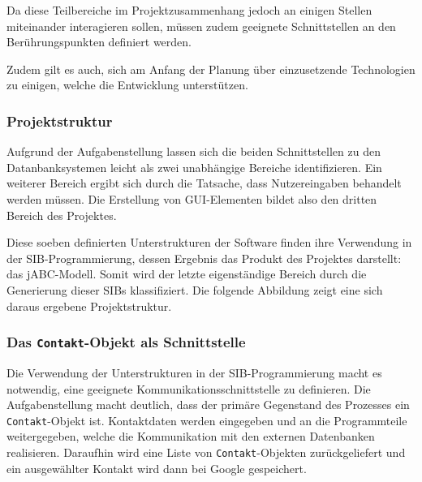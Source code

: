Da diese Teilbereiche im Projektzusammenhang jedoch an einigen Stellen miteinander interagieren sollen, müssen
 zudem geeignete Schnittstellen an den Berührungspunkten definiert werden.
 
Zudem gilt es auch, sich am Anfang der Planung über einzusetzende Technologien zu einigen, welche die Entwicklung unterstützen.

\subsubsection{Projektstruktur}
Aufgrund der Aufgabenstellung lassen sich die beiden Schnittstellen zu den Datanbanksystemen leicht als zwei
 unabhängige Bereiche identifizieren.
Ein weiterer Bereich ergibt sich durch die Tatsache, dass Nutzereingaben behandelt werden müssen.
Die Erstellung von GUI-Elementen bildet also den dritten Bereich des Projektes.

Diese soeben definierten Unterstrukturen der Software finden ihre Verwendung in der SIB-Programmierung, dessen
 Ergebnis das Produkt des Projektes darstellt: das jABC-Modell.
Somit wird der letzte eigenständige Bereich durch die Generierung dieser SIBs klassifiziert.
Die folgende Abbildung zeigt eine sich daraus ergebene Projektstruktur.
	
\subsubsection{Das \lstinline{Contakt}-Objekt als Schnittstelle}
Die Verwendung der Unterstrukturen in der SIB-Programmierung macht es notwendig, eine geeignete
 Kommunikationsschnittstelle zu definieren.
Die Aufgabenstellung macht deutlich, dass der primäre Gegenstand des Prozesses ein \lstinline{Contakt}-Objekt ist.
Kontaktdaten werden eingegeben und an die Programmteile weitergegeben, welche die Kommunikation mit den
 externen Datenbanken realisieren.
Daraufhin wird eine Liste von \lstinline{Contakt}-Objekten zurückgeliefert und ein ausgewählter Kontakt wird
 dann bei Google gespeichert.
 
